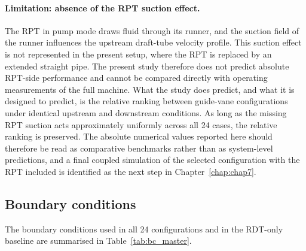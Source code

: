 \paragraph{Limitation: absence of the RPT suction effect.}
The RPT in pump mode draws fluid through its runner, and the suction field of the runner influences the upstream draft-tube velocity profile. This suction effect is not represented in the present setup, where the RPT is replaced by an extended straight pipe. The present study therefore does not predict absolute RPT-side performance and cannot be compared directly with operating measurements of the full machine. What the study does predict, and what it is designed to predict, is the relative ranking between guide-vane configurations under identical upstream and downstream conditions. As long as the missing RPT suction acts approximately uniformly across all 24 cases, the relative ranking is preserved. The absolute numerical values reported here should therefore be read as comparative benchmarks rather than as system-level predictions, and a final coupled simulation of the selected configuration with the RPT included is identified as the next step in Chapter~\ref{chap:chap7}.
 
\subsection{Boundary conditions}
\label{sec:methods_bc}
 
The boundary conditions used in all 24 configurations and in the RDT-only baseline are summarised in Table~\ref{tab:bc_master}.
 
